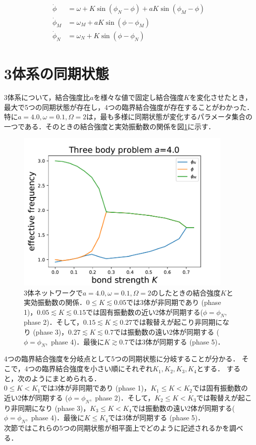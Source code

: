 \documentclass[../main]{subfiles}
\begin{document}
\begin{align}
    \label{eq:3body}
    \begin{split}
        \dot{\phi}&=\omega+K\sin\left( \phi_N-\phi \right)+aK\sin\left( \phi_M-\phi \right)\\
        \dot{\phi}_M&=\omega_M+aK\sin\left( \phi-\phi_M \right) \\
        \dot{\phi}_N&=\omega_N+K\sin\left( \phi-\phi_N \right)    
    \end{split}
\end{align}
\section{3体系の同期状態}
3体系について，結合強度比$a$を様々な値で固定し結合強度$K$を変化させたとき，最大で5つの同期状態が存在し，4つの臨界結合強度が存在することがわかった．
特に$a=4.0,\omega=0.1,\Omega=2$は，最も多様に同期状態が変化するパラメータ集合の一つである．そのときの結合強度と実効振動数の関係を図\ref{fig:3body-state}に示す．
\begin{figure}[t]
\centering
\includegraphics[width=105mm]{./images/three-body-prob.pdf}
\centering
\caption{3体ネットワークで$a=4.0,\omega=0.1,\Omega=2$のしたときの結合強度$K$と実効振動数の関係．$0\leq K\lesssim 0.05$では3体が非同期であり (phase 1)，$0.05\lesssim K\lesssim 0.15$では固有振動数の近い2体が同期する($\phi=\phi_N$, phase 2)．そして，$0.15 \lesssim K\lesssim 0.27$では鞍替えが起こり非同期になり (phase 3)，$0.27\lesssim K\lesssim 0.7$では振動数の遠い2体が同期する ($\phi=\phi_N$,\ phase 4)．最後に$K\gtrsim 0.7$では3体が同期する (phase 5)．}
\label{fig:3body-state}
\end{figure}
4つの臨界結合強度を分岐点として5つの同期状態に分岐することが分かる．
そこで，4つの臨界結合強度を小さい順にそれぞれ$K_1,K_2,K_3,K_4$とする．
すると，次のようにまとめられる．\\
$0\leq K<K_1$では3体が非同期であり (phase 1)，$K_1\leq K<K_2$では固有振動数の近い2体が同期する ($\phi=\phi_N$,\ phase 2)．そして，$K_2\leq K<K_3$では鞍替えが起こり非同期になり (phase 3)，$K_3\leq K<K_4$では振動数の遠い2体が同期する($\phi=\phi_N$,\ phase 4)．最後に$K\leq K_4$では3体が同期する (phase 5)．\\
次節ではこれらの5つの同期状態が相平面上でどのように記述されるかを調べる．
\end{document}
